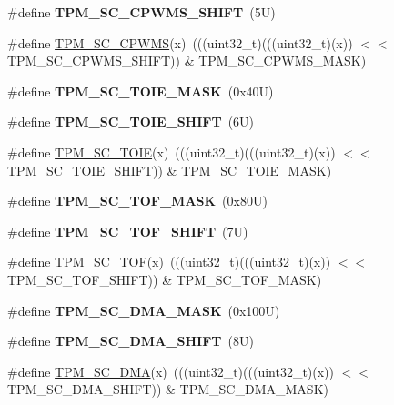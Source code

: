 \begin{DoxyCompactItemize}
\#define {\bfseries T\+P\+M\+\_\+\+S\+C\+\_\+\+C\+P\+W\+M\+S\+\_\+\+S\+H\+I\+FT}~(5\+U)
\item 
\#define \mbox{\hyperlink{group___t_p_m___register___masks_gab2cc78fe1027407f56ca1d634504c6de}{T\+P\+M\+\_\+\+S\+C\+\_\+\+C\+P\+W\+MS}}(x)~(((uint32\+\_\+t)(((uint32\+\_\+t)(x)) $<$$<$ T\+P\+M\+\_\+\+S\+C\+\_\+\+C\+P\+W\+M\+S\+\_\+\+S\+H\+I\+FT)) \& T\+P\+M\+\_\+\+S\+C\+\_\+\+C\+P\+W\+M\+S\+\_\+\+M\+A\+SK)
\item 
\mbox{\label{group___t_p_m___register___masks_ga67bad1290533531584e40005c865380d}} 
\#define {\bfseries T\+P\+M\+\_\+\+S\+C\+\_\+\+T\+O\+I\+E\+\_\+\+M\+A\+SK}~(0x40\+U)
\item 
\mbox{\label{group___t_p_m___register___masks_ga6ab65f7b4d48095133fd762e1595eb3a}} 
\#define {\bfseries T\+P\+M\+\_\+\+S\+C\+\_\+\+T\+O\+I\+E\+\_\+\+S\+H\+I\+FT}~(6\+U)
\item 
\#define \mbox{\hyperlink{group___t_p_m___register___masks_ga81f381f640b9d867e67822fba52b1faa}{T\+P\+M\+\_\+\+S\+C\+\_\+\+T\+O\+IE}}(x)~(((uint32\+\_\+t)(((uint32\+\_\+t)(x)) $<$$<$ T\+P\+M\+\_\+\+S\+C\+\_\+\+T\+O\+I\+E\+\_\+\+S\+H\+I\+FT)) \& T\+P\+M\+\_\+\+S\+C\+\_\+\+T\+O\+I\+E\+\_\+\+M\+A\+SK)
\item 
\mbox{\label{group___t_p_m___register___masks_gae25305cad922790ffe882f8d4d423439}} 
\#define {\bfseries T\+P\+M\+\_\+\+S\+C\+\_\+\+T\+O\+F\+\_\+\+M\+A\+SK}~(0x80\+U)
\item 
\mbox{\label{group___t_p_m___register___masks_gaa58c9acc6863e92d142671b2da4b60a5}} 
\#define {\bfseries T\+P\+M\+\_\+\+S\+C\+\_\+\+T\+O\+F\+\_\+\+S\+H\+I\+FT}~(7\+U)
\item 
\#define \mbox{\hyperlink{group___t_p_m___register___masks_gacfa7d026ef3dcc0db7720661193022ec}{T\+P\+M\+\_\+\+S\+C\+\_\+\+T\+OF}}(x)~(((uint32\+\_\+t)(((uint32\+\_\+t)(x)) $<$$<$ T\+P\+M\+\_\+\+S\+C\+\_\+\+T\+O\+F\+\_\+\+S\+H\+I\+FT)) \& T\+P\+M\+\_\+\+S\+C\+\_\+\+T\+O\+F\+\_\+\+M\+A\+SK)
\item 
\mbox{\label{group___t_p_m___register___masks_ga5d17b5a81f3f84eee65c94d5b0e7eca6}} 
\#define {\bfseries T\+P\+M\+\_\+\+S\+C\+\_\+\+D\+M\+A\+\_\+\+M\+A\+SK}~(0x100\+U)
\item 
\mbox{\label{group___t_p_m___register___masks_ga04279ab580223012d6e172ce92a5f8c5}} 
\#define {\bfseries T\+P\+M\+\_\+\+S\+C\+\_\+\+D\+M\+A\+\_\+\+S\+H\+I\+FT}~(8\+U)
\item 
\#define \mbox{\hyperlink{group___t_p_m___register___masks_ga378b523c95d8ba9d626e426bfc91c3e2}{T\+P\+M\+\_\+\+S\+C\+\_\+\+D\+MA}}(x)~(((uint32\+\_\+t)(((uint32\+\_\+t)(x)) $<$$<$ T\+P\+M\+\_\+\+S\+C\+\_\+\+D\+M\+A\+\_\+\+S\+H\+I\+FT)) \& T\+P\+M\+\_\+\+S\+C\+\_\+\+D\+M\+A\+\_\+\+M\+A\+SK)
\end{DoxyCompactItemize}
